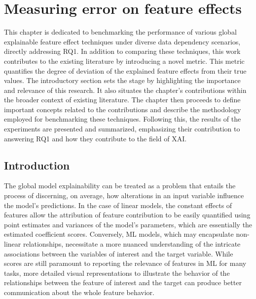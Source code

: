 \chapter{Measuring error on feature effects}
\label{chap:AssALE}

This chapter is dedicated to benchmarking the performance of various global explainable feature effect techniques under diverse data dependency scenarios, directly addressing RQ1. In addition to comparing these techniques, this work contributes to the existing literature by introducing a novel metric. This metric quantifies the degree of deviation of the explained feature effects from their true values. The introductory section sets the stage by highlighting the importance and relevance of this research. It also situates the chapter's contributions within the broader context of existing literature. The chapter then proceeds to define important concepts related to the contributions and describe the methodology employed for benchmarking these techniques. Following this, the results of the experiments are presented and summarized, emphasizing their contribution to answering RQ1 and how they contribute to the field of \gls{XAI}.

\begin{center}
\end{center}


\section{Introduction}

The global model explainability can be treated as a problem that entails the process of discerning, on average, how alterations in an input variable influence the model's predictions. In the case of linear models, the constant effects of features allow the attribution of feature contribution to be easily quantified using point estimates and variances of the model's parameters, which are essentially the estimated coefficient scores\cite{TrevorHastieRobertTibshirani2014AssessmentSelection}. Conversely, \gls{ML} models, which may encapsulate non-linear relationships, necessitate a more nuanced understanding of the intricate associations between the variables of interest and the target variable. While scores are still paramount to reporting the relevance of features in ML for many tasks, more detailed visual representations to illustrate the behavior of the relationships between the feature of interest and the target can produce better communication about the whole feature behavior.

